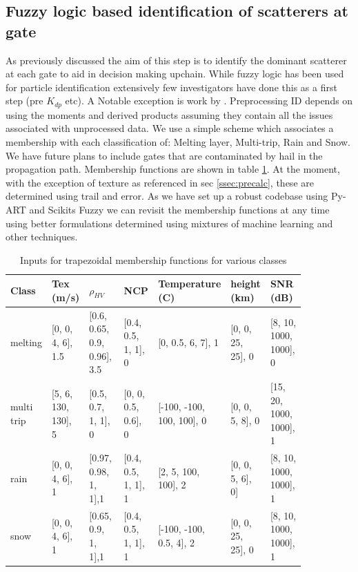 \documentclass[twocol]{ametsoc}
\begin{document}
\subsection{Fuzzy logic based identification of scatterers at gate}
As previously discussed the aim of this step is to identify the dominant scatterer at each gate to aid in decision making 
upchain. While fuzzy logic has been used for particle identification extensively few investigators have done this as a first step (pre $K_{dp}$ etc). A Notable exception is work by 
  \cite{gourley_fuzzy_2007}. Preprocessing ID depends on using the moments and derived products assuming they contain all the issues associated with unprocessed data. 
  We use a simple scheme which associates a membership with each classification of: Melting layer, Multi-trip, Rain and Snow. We have future plans to include gates that are contaminated
  by hail in the propagation path. Membership functions are shown in table \ref{tab:mbf}. At the moment, with the exception of texture as referenced in sec \ref{ssec:precalc}, these are determined using 
  trail and error. As we have set up a robust codebase using Py-ART and Scikits Fuzzy we can revisit the membership functions at any time using better formulations 
  determined using mixtures of machine learning and other techniques. 

\begin{table}[ht]
\caption{Inputs for trapezoidal membership functions for various classes }
\label{tab:mbf}
\centering
\begin{tabular}{p{0.05\linewidth}p{0.12\linewidth}p{0.16\linewidth}p{0.12\linewidth}p{0.14\linewidth}p{0.12\linewidth}p{0.14\linewidth}}
\hline
Class & Tex (m/s)& $\rho_{HV} $ &NCP & Temperature (C) &height (km)  & SNR (dB)\\
\hline
melting & [0, 0, 4, 6], 1.5& [0.6, 0.65, 0.9, 0.96], 3.5& [0.4, 0.5, 1, 1], 0& [0, 0.5, 6, 7], 1& [0, 0, 25, 25], 0& [8, 10, 1000, 1000], 0 \\
multi trip &[5, 6, 130, 130], 5&[0.5, 0.7, 1, 1], 0&[0, 0, 0.5, 0.6], 0&[-100, -100, 100, 100], 0&[0, 0, 5, 8], 0&[15, 20, 1000, 1000], 1\\
rain &[0, 0, 4, 6], 1& [0.97, 0.98, 1, 1],1& [0.4, 0.5, 1, 1], 1& [2, 5, 100, 100], 2& [0, 0, 5, 6], 0]& [8, 10, 1000, 1000], 1\\
snow &[0, 0, 4, 6], 1& [0.65, 0.9, 1, 1],1& [0.4, 0.5, 1, 1], 1& [-100, -100, 0.5, 4], 2& [0, 0, 25, 25], 0& [8, 10, 1000, 1000], 1\\
\hline
\end{tabular}
\end{table}
\end{document}
